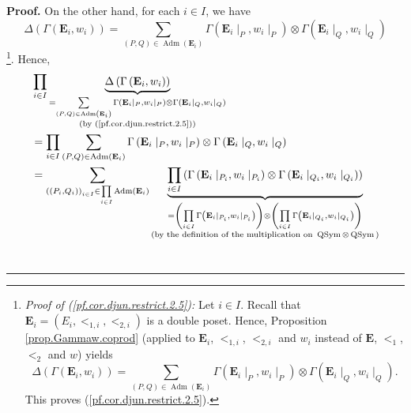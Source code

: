 \documentclass[numbers=enddot,12pt,final,onecolumn,notitlepage,abstracton]{scrartcl}
\theoremstyle{definition}
\newenvironment{proof}[1][Proof]{\noindent\textbf{#1.} }{\ \rule{0.5em}{0.5em}}
\let\sumnonlimits\sum
\let\prodnonlimits\prod
\renewcommand{\sum}{\sumnonlimits\limits}
\renewcommand{\prod}{\prodnonlimits\limits}
\newenvironment{verlong}{}{}
\begin{document}
\begin{verlong}
\begin{footnotesize}
\begin{proof}
On the other hand, for each $i\in I$, we have%
\begin{equation}
\Delta\left(  \Gamma\left(  \mathbf{E}_{i},w_{i}\right)  \right)
=\sum_{\left(  P,Q\right)  \in\operatorname{Adm}\left(  \mathbf{E}_{i}\right)
}\Gamma\left(  \mathbf{E}_{i}\mid_{P},w_{i}\mid_{P}\right)  \otimes
\Gamma\left(  \mathbf{E}_{i}\mid_{Q},w_{i}\mid_{Q}\right)
\label{pf.cor.djun.restrict.2.5}%
\end{equation}
\footnote{\textit{Proof of (\ref{pf.cor.djun.restrict.2.5}):} Let $i\in I$.
Recall that $\mathbf{E}_{i}=\left(  E_{i},<_{1,i},<_{2,i}\right)  $ is a
double poset. Hence, Proposition \ref{prop.Gammaw.coprod} (applied to
$\mathbf{E}_{i}$, $<_{1,i}$, $<_{2,i}$ and $w_{i}$ instead of $\mathbf{E}$,
$<_{1}$, $<_{2}$ and $w$) yields%
\[
\Delta\left(  \Gamma\left(  \mathbf{E}_{i},w_{i}\right)  \right)
=\sum_{\left(  P,Q\right)  \in\operatorname{Adm}\left(  \mathbf{E}_{i}\right)
}\Gamma\left(  \mathbf{E}_{i}\mid_{P},w_{i}\mid_{P}\right)  \otimes
\Gamma\left(  \mathbf{E}_{i}\mid_{Q},w_{i}\mid_{Q}\right)  .
\]
This proves (\ref{pf.cor.djun.restrict.2.5}).}. Hence,%
\begin{align*}
&  \prod_{i\in I}\underbrace{\Delta\left(  \Gamma\left(  \mathbf{E}_{i}%
,w_{i}\right)  \right)  }_{\substack{=\sum_{\left(  P,Q\right)  \in
\operatorname{Adm}\left(  \mathbf{E}_{i}\right)  }\Gamma\left(  \mathbf{E}%
_{i}\mid_{P},w_{i}\mid_{P}\right)  \otimes\Gamma\left(  \mathbf{E}_{i}\mid
_{Q},w_{i}\mid_{Q}\right)  \\\text{(by (\ref{pf.cor.djun.restrict.2.5}))}}}\\
&  =\prod_{i\in I}\sum_{\left(  P,Q\right)  \in\operatorname{Adm}\left(
\mathbf{E}_{i}\right)  }\Gamma\left(  \mathbf{E}_{i}\mid_{P},w_{i}\mid
_{P}\right)  \otimes\Gamma\left(  \mathbf{E}_{i}\mid_{Q},w_{i}\mid_{Q}\right)
\\
&  =\sum_{\left(  \left(  P_{i},Q_{i}\right)  \right)  _{i\in I}\in\prod_{i\in
I}\operatorname*{Adm}\left(  \mathbf{E}_{i}\right)  }\underbrace{\prod_{i\in
I}\left(  \Gamma\left(  \mathbf{E}_{i}\mid_{P_{i}},w_{i}\mid_{P_{i}}\right)
\otimes\Gamma\left(  \mathbf{E}_{i}\mid_{Q_{i}},w_{i}\mid_{Q_{i}}\right)
\right)  }_{\substack{=\left(  \prod_{i\in I}\Gamma\left(  \mathbf{E}_{i}%
\mid_{P_{i}},w_{i}\mid_{P_{i}}\right)  \right)  \otimes\left(  \prod_{i\in
I}\Gamma\left(  \mathbf{E}_{i}\mid_{Q_{i}},w_{i}\mid_{Q_{i}}\right)  \right)
\\\text{(by the definition of the multiplication on }\operatorname*{QSym}%
\otimes\operatorname*{QSym}\text{)}}}\\

\end{align*}
\end{proof}
\end{footnotesize}
\end{verlong}
\end{document}
